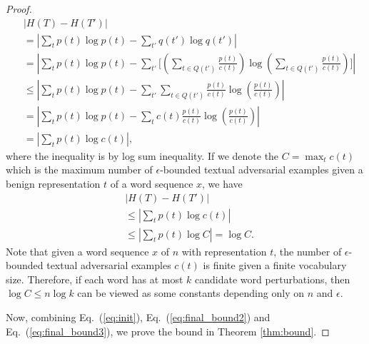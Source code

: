 \documentclass{article} \usepackage{iclr2021_conference,times}
\theoremstyle{definition}
\theoremstyle{remark}
\begin{document}
\begin{proof}
\begin{align}
    \label{eq:init3}
    & |H(T) - H(T')| \\
    & = |\sum_t p(t) \log p(t) - \sum_{t'} q(t') \log q(t')| \\
    & = |\sum_t p(t) \log p(t) - \sum_{t'} \big[ (\sum_{t \in Q(t')} \frac{p(t)}{c(t)} ) \log(\sum_{t \in Q(t')} \frac{p(t)}{c(t)} ) \big] | \\
    & \le |\sum_t p(t) \log p(t) - \sum_{t'} \sum_{t \in Q(t')}  \frac{p(t)}{c(t)} \log(\frac{p(t)}{c(t)}) | \\ 
    & = |\sum_t p(t) \log p(t) - \sum_t c(t) \frac{p(t)}{c(t)} \log(\frac{p(t)}{c(t)}) |  \\
    & = |\sum_t p(t) \log c(t) |,
\end{align}
where the inequality is by log sum inequality. If we denote the $C = \max_t c(t)$ which is the maximum number of $\epsilon$-bounded textual adversarial examples given a benign representation $t$ of a word sequence $x$, we have 
\begin{align}
    & |H(T) - H(T')| \\
    & \le |\sum_t p(t) \log c(t) | \\
    & \le |\sum_t p(t) \log C|  = \log C. \label{eq:final_bound3}
\end{align}
Note that given a word sequence $x$ of $n$ with representation $t$, the number of $\epsilon$-bounded textual adversarial examples $c(t)$ is finite given a finite vocabulary size. Therefore, if each word has at most $k$ candidate word perturbations, then $\log C \le n\log k$ can be viewed as some constants depending only on $n$ and $\epsilon$.

Now, combining Eq.~(\ref{eq:init}), Eq.~(\ref{eq:final_bound2}) and Eq.~(\ref{eq:final_bound3}), we prove the bound in Theorem \ref{thm:bound}.
\end{proof}




 
\end{document}
